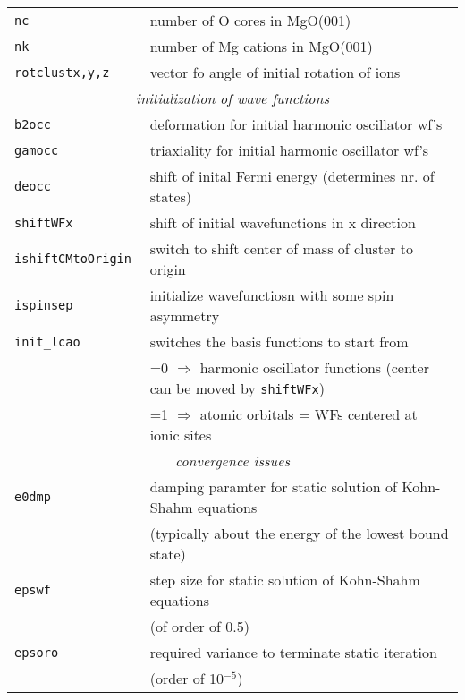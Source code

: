 \documentclass[12pt]{article}
\begin{document}
\begin{tabular}{ll}
{\tt nc               }& number of O cores in MgO(001)\\
{\tt nk               }& number of Mg cations in MgO(001)\\
{\tt rotclustx,y,z } & vector fo angle of initial rotation of ions\\
\hline
\multicolumn{2}{c}{\it initialization of wave functions} \\
\hline
{\tt b2occ            }& deformation for initial harmonic oscillator wf's\\
{\tt gamocc           }& triaxiality for initial harmonic oscillator wf's\\
{\tt deocc            }& shift of inital Fermi energy (determines nr. of
states)\\
{\tt shiftWFx         }& shift of initial wavefunctions in x direction \\
{\tt ishiftCMtoOrigin }& switch to shift center of mass of cluster to origin\\
{\tt ispinsep         }& initialize wavefunctiosn with some spin asymmetry\\
{\tt init\_lcao       }& switches the basis functions to start from\\
& =0 $\Longrightarrow$ harmonic oscillator functions (center can be
moved
  by {\tt shiftWFx})
\\
& =1 $\Longrightarrow$ atomic orbitals = WFs centered at ionic sites
\\
\hline
\multicolumn{2}{c}{\it convergence issues} \\
\hline
{\tt e0dmp            }& damping paramter for static solution of Kohn-Shahm equations\\
& (typically about the energy of the lowest bound state)\\
{\tt epswf            }& step size for static solution of Kohn-Shahm
equations\\
& (of order of 0.5)\\
{\tt epsoro           }& required variance to terminate static iteration\\
&(order of 10$^{-5}$)\\
\hline
\end{tabular}

\newpage
\end{document}
